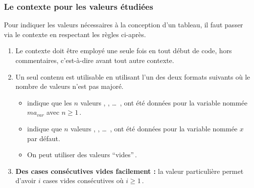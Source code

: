 \documentclass[10pt, a4paper]{tutodoc}
\begin{document}

\subsubsection{Le contexte  pour les valeurs étudiées}
\label{tns-math-functab-dsl-l3-ctxt-xvals}

Pour indiquer les valeurs nécessaires à la conception d'un tableau, il faut passer via le contexte  en respectant les règles ci-après.
%
\begin{enumerate}
    \item Le contexte  doit être employé une seule fois en tout début de code, hors commentaires, c'est-à-dire avant tout autre contexte.


    \item Un seul contenu est utilisable en utilisant l'un des deux formats suivants où le nombre de valeurs n'est pas majoré.
    \begin{itemize}
        \item {} indique que les $n$ valeurs  ,  , \dots\ ,  ont été données pour la variable nommée $ma_{var}$ avec $n \geq 1$\,.

        \item {} indique que $n$ valeurs  ,  , \dots\ ,  ont été données pour la variable nommée $x$ par défaut.
        
        \item On peut utiliser des valeurs \enquote{vides}\,.
    \end{itemize}


    \item \textbf{Des cases consécutives vides facilement :} la valeur particulière  permet d'avoir $i$ cases vides consécutives où $i \geq 1$\,.
\end{enumerate}


\medskip
\end{document}

